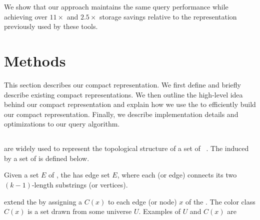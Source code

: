 We show that our approach maintains the same query
performance while achieving over $11\times$ and $2.5\times$ storage savings
relative to the representation previously used by these tools.

\section{Methods}
\label{methods}

This section describes our compact \cdbg representation.  We first define \cdbgs
and briefly describe existing compact \cdbg representations.  We then outline
the high-level idea behind our compact representation and explain how we use the
\dbg to efficiently build our compact representation.  Finally, we describe
implementation details and optimizations to our query algorithm.

\subsection{\longCdbgs}
\label{subsec:cdbg}
\dBGs are widely used to represent the topological structure of a set of
\kmers~\cite{pevzner2001eulerian,Simpson09Abyss,SchulzZeVi12,zerbino08velvet,GrabherrHqYa11,ChangLi15,LiuLi16,PandeyBeJo2017d}.
The \dbg induced by a set of \kmers is defined below.

\begin{definition}
    Given a set $E$ of \kmers, the  has edge set $E$,
    where each \kmer (or edge) connects its two $(k-1)$-length substrings (or
    vertices).
\end{definition}

\Cdbgs extend the \dbg by assigning a  $C(x)$ to each edge (or
node) $x$ of the \dbg.  The color class $C(x)$ is a set drawn from some universe
$U$.  Examples of $U$ and $C(x)$ are

